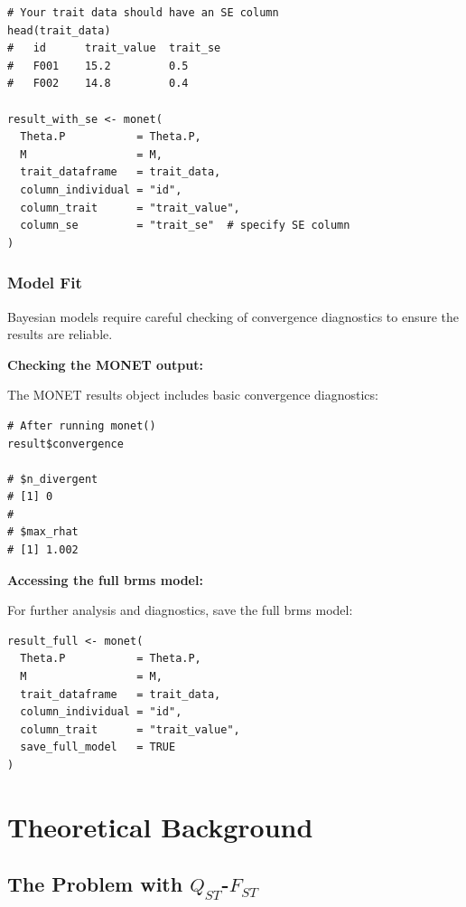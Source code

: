 \documentclass[11pt]{article}
\begin{document}
\begin{lstlisting}
# Your trait data should have an SE column
head(trait_data)
#   id      trait_value  trait_se
#   F001    15.2         0.5
#   F002    14.8         0.4

result_with_se <- monet(
  Theta.P           = Theta.P,
  M                 = M,
  trait_dataframe   = trait_data,
  column_individual = "id",
  column_trait      = "trait_value",
  column_se         = "trait_se"  # specify SE column
)
\end{lstlisting}

\subsubsection{Model Fit}

Bayesian models require careful checking of convergence diagnostics to ensure the results are reliable.

\textbf{Checking the MONET output:}

The MONET results object includes basic convergence diagnostics:

\begin{lstlisting}
# After running monet()
result$convergence

# $n_divergent
# [1] 0
#
# $max_rhat
# [1] 1.002
\end{lstlisting}

\textbf{Accessing the full brms model:}

For further analysis and diagnostics, save the full brms model:

\begin{lstlisting}
result_full <- monet(
  Theta.P           = Theta.P,
  M                 = M,
  trait_dataframe   = trait_data,
  column_individual = "id",
  column_trait      = "trait_value",
  save_full_model   = TRUE
)
\end{lstlisting}


\section{Theoretical Background}

\subsection{The Problem with $Q_{ST}$-$F_{ST}$}
\end{document}
